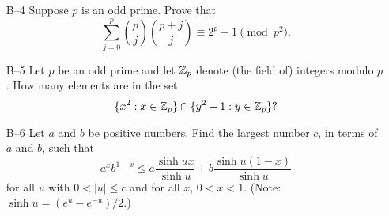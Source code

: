 \documentclass[amssymb,twocolumn,pra,10pt,aps]{revtex4-1}
\begin{document}
\begin{itemize}
\item[B--4]
Suppose $p$ is an odd prime. Prove that
\[
\sum_{j=0}^p \binom{p}{j} \binom{p+j}{j} \equiv 2^p + 1\pmod{p^2}.
\]

\item[B--5]
Let $p$ be an odd prime and let ${\mathbb{Z}}_p$ denote (the field of) integers
modulo $p$. How many elements are in the set
\[
\{x^2: x \in {\mathbb{Z}}_p\} \cap \{y^2 + 1 : y \in {\mathbb{Z}}_p\}?
\]

\item[B--6]
Let $a$ and $b$ be positive numbers. Find the largest number $c$, in
terms of $a$ and $b$, such that
\[
a^x b^{1-x} \leq a \frac{\sinh ux}{\sinh u} + b \frac{\sinh u(1-x)}{\sinh u}
\]
for all $u$ with $0 < |u| \leq c$ and for all $x$, $0 < x < 1$. (Note:
$\sinh u = (e^u - e^{-u})/2$.)
\end{itemize}
\end{document}
